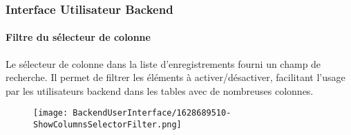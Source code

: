 %

\begin{frame}[fragile]
	\frametitle{Interface Utilisateur Backend}
	\framesubtitle{Filtre du sélecteur de colonne}

    Le sélecteur de colonne dans la liste d'enregistrements fourni un champ de
    recherche. Il permet de filtrer les éléments à activer/désactiver, facilitant
    l'usage par les utilisateurs backend dans les tables avec de nombreuses colonnes.

	\begin{figure}
		\texttt{[image: BackendUserInterface/1628689510-ShowColumnsSelectorFilter.png]}
	\end{figure}

\end{frame}


